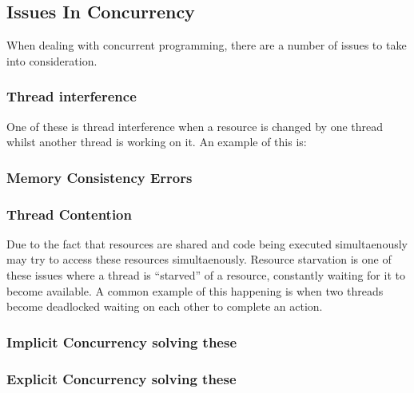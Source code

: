 \documentclass[]{report}
\begin{document}
\subsection{Issues In Concurrency}
When dealing with concurrent programming, there are a number of issues to take into consideration.

\subsubsection{Thread interference}
One of these is thread interference when a resource is changed by one thread whilst another thread is working on it. An example of this is:
\subsubsection{Memory Consistency Errors}
\subsubsection{Thread Contention}
Due to the fact that resources are shared and code being executed simultaenously may try to access these resources simultaenously. Resource starvation is one of these issues where a thread is “starved” of a resource, constantly waiting for it to become available. A common example of this happening is when two threads become deadlocked waiting on each other to complete an action.
\subsubsection{Implicit Concurrency solving these}
\subsubsection{Explicit Concurrency solving these}
\end{document}
